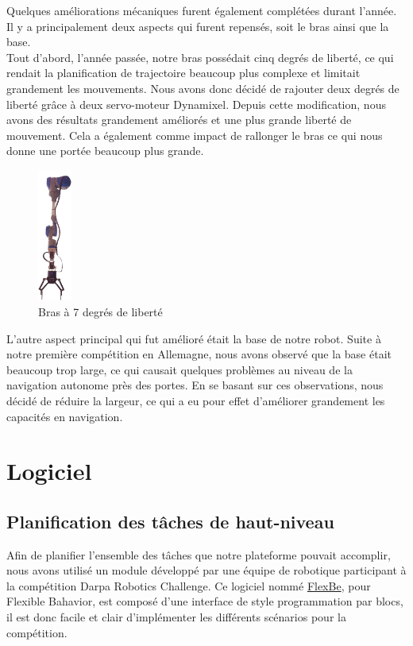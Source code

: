 \documentclass[runningheads,a4paper]{llncs}
\begin{document}
Quelques améliorations mécaniques furent également complétées durant l'année. Il y a principalement deux aspects qui furent repensés, soit le bras ainsi que la base.\\

Tout d'abord, l'année passée, notre bras possédait cinq degrés de liberté, ce qui rendait la planification de trajectoire beaucoup plus complexe et limitait grandement les mouvements. Nous avons donc décidé de rajouter deux degrés de liberté grâce à deux servo-moteur Dynamixel. Depuis cette modification, nous avons des résultats grandement améliorés et une plus grande liberté de mouvement. Cela a également comme impact de rallonger le bras ce qui nous donne une portée beaucoup plus grande.\\

\begin{figure}
	\centering
	\includegraphics[width=0.10\textwidth]{images/arm.png}
	\caption{Bras à 7 degrés de liberté}
\end{figure}

L'autre aspect principal qui fut amélioré était la base de notre robot. Suite à notre première compétition en Allemagne, nous avons observé que la base était beaucoup trop large, ce qui causait quelques problèmes au niveau de la navigation autonome près des portes. En se basant sur ces observations, nous décidé de réduire la largeur, ce qui a eu pour effet d'améliorer grandement les capacités en navigation. \\
\newpage
\section{Logiciel}

\subsection{Planification des tâches de haut-niveau}
Afin de planifier l'ensemble des tâches que notre plateforme pouvait accomplir, nous avons utilisé un module développé par une équipe de robotique participant à la compétition Darpa Robotics Challenge. Ce logiciel nommé \href{http://philserver.bplaced.net/fbe/index.php}{FlexBe}\cite{schillinger2016flexbe}, pour Flexible Bahavior, est composé d'une interface de style programmation par blocs, il est donc facile et clair d'implémenter les différents scénarios pour la compétition.\\
\end{document}
